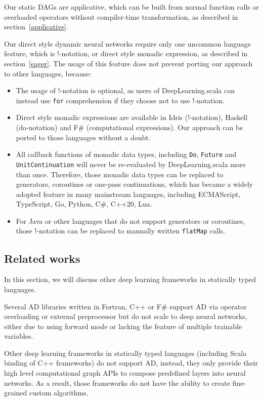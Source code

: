 Our static DAGs are applicative, which can be built from normal function calls or overloaded operators without compiler-time transformation, as described in section~\ref{applicative}.

Our direct style dynamic neural networks require only one uncommon language feature, which is !-notation, or direct style monadic expression, as described in section~\ref{eager}. The usage of this feature does not prevent porting our approach to other languages, because:

\begin{itemize}
  \item The usage of !-notation is optional, as users of DeepLearning.scala can instead use \lstinline{for} comprehension if they choose not to use !-notation.
  \item Direct style monadic expressions are available in Idris (!-notation), Haskell (do-notation) and F\# (computational expressions). Our approach can be ported to those languages without a doubt.
  \item All callback functions of monadic data types, including \lstinline{Do}, \lstinline{Future} and \lstinline{UnitContinuation} will never be re-evaluated by DeepLearning.scala more than once. Therefore, those monadic data types can be replaced to generators, coroutines or one-pass continuations, which has became a widely adopted feature in many mainstream languages, including ECMAScript, TypeScript, Go, Python, C\#, C++20, Lua.
  \item For Java or other languages that do not support generators or coroutines, those !-notation can be replaced to manually written \lstinline{flatMap} calls.
\end{itemize}

\subsection{Related works}

In this section, we will discuss other deep learning frameworks in statically typed languages.

Several AD libraries\cite{bischof1992adifor,griewank1996algorithm,TapenadeRef13,baydin2015diffsharp} written in Fortran, C++ or F\# support AD via operator overloading or external preprocessor but do not scale to deep neural networks, either due to using forward mode or lacking the feature of multiple trainable variables.

Other deep learning frameworks in statically typed languages (including Scala binding of C++ frameworks)\cite{intel2016bigdl,skymind2017deeplearning4j,baydin2016hype,chen2017typesafe,zhao2017deepdsl} do not support AD, instead, they only provide their high level \gls{computational graph} APIs to compose predefined layers into neural networks. As a result, those frameworks do not have the ability to create fine-grained custom algorithms.

